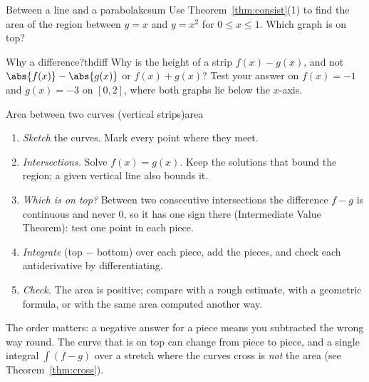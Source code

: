 \documentclass[11pt]{article}
\begin{document}
\begin{kc}{Between a line and a parabola}{kcsum}
Use Theorem~\ref{thm:consist}(1) to find the area of the region between $y=x$ and $y=x^2$ for $0\le x\le1$. Which graph is on top?
\end{kc}

\begin{think}{Why a difference?}{thdiff}
Why is the height of a strip $f(x)-g(x)$, and not $\abs{f(x)}-\abs{g(x)}$ or $f(x)+g(x)$? Test your answer on $f(x)=-1$ and $g(x)=-3$ on $[0,2]$, where both graphs lie below the $x$-axis.
\end{think}

\begin{proc}{Area between two curves (vertical strips)}{area}
\begin{enumerate}[nosep]
  \item \emph{Sketch} the curves. Mark every point where they meet.
  \item \emph{Intersections.} Solve $f(x)=g(x)$. Keep the solutions that bound the region; a given vertical line also bounds it.
  \item \emph{Which is on top?} Between two consecutive intersections the difference $f-g$ is continuous and never $0$, so it has one sign there (Intermediate Value Theorem): test one point in each piece.
  \item \emph{Integrate} (top $-$ bottom) over each piece, add the pieces, and check each antiderivative by differentiating.
  \item \emph{Check.} The area is positive; compare with a rough estimate, with a geometric formula, or with the same area computed another way.
\end{enumerate}
\end{proc}

\begin{warn}
The order matters: a negative answer for a piece means you subtracted the wrong way round. The curve that is on top can change from piece to piece, and a single integral $\int(f-g)$ over a stretch where the curves cross is \emph{not} the area (see Theorem~\ref{thm:cross}).
\end{warn}
\end{document}
